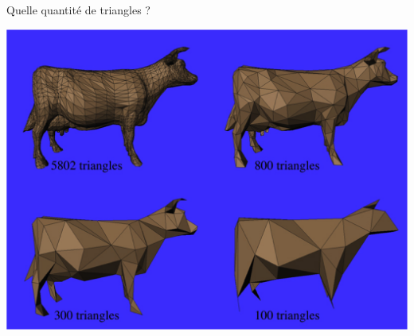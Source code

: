 \begin{frame}{Quelle quantité de triangles ?}
\begin{center}
\includegraphics[height=.8\textheight]{figs/triangles}
\end{center}
\end{frame}

